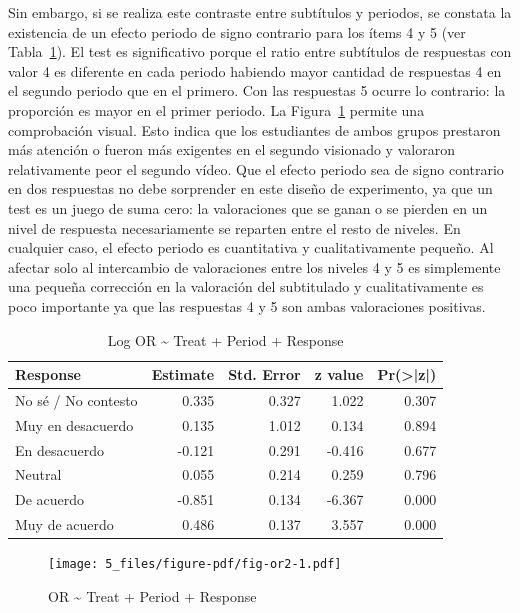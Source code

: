 \documentclass[
  12pt,
  a4paper,
  extrafontsizes,
  onecolumn,
  openright,
  table]{memoir}
\begin{document}
Sin embargo, si se realiza este contraste entre subtítulos y periodos,
se constata la existencia de un efecto periodo de signo contrario para
los ítems 4 y 5 (ver Tabla~\ref{tbl-logor2}). El test es significativo
porque el ratio entre subtítulos de respuestas con valor 4 es diferente
en cada periodo habiendo mayor cantidad de respuestas 4 en el segundo
periodo que en el primero. Con las respuestas 5 ocurre lo contrario: la
proporción es mayor en el primer periodo. La Figura~\ref{fig-or2}
permite una comprobación visual. Esto indica que los estudiantes de
ambos grupos prestaron más atención o fueron más exigentes en el segundo
visionado y valoraron relativamente peor el segundo vídeo. Que el efecto
periodo sea de signo contrario en dos respuestas no debe sorprender en
este diseño de experimento, ya que un test es un juego de suma cero: la
valoraciones que se ganan o se pierden en un nivel de respuesta
necesariamente se reparten entre el resto de niveles. En cualquier caso,
el efecto periodo es cuantitativa y cualitativamente pequeño. Al afectar
solo al intercambio de valoraciones entre los niveles 4 y 5 es
simplemente una pequeña corrección en la valoración del subtitulado y
cualitativamente es poco importante ya que las respuestas 4 y 5 son
ambas valoraciones positivas.

\hypertarget{tbl-logor2}{}
\begin{longtable}{lrrrr}
\caption{\label{tbl-logor2}Log OR \textasciitilde{} Treat + Period + Response }\tabularnewline

\toprule
Response & Estimate & Std. Error & z value & Pr(>|z|) \\ 
\midrule
No sé / No contesto & 0.335 & 0.327 & 1.022 & 0.307 \\ 
Muy en desacuerdo & 0.135 & 1.012 & 0.134 & 0.894 \\ 
En desacuerdo & -0.121 & 0.291 & -0.416 & 0.677 \\ 
Neutral & 0.055 & 0.214 & 0.259 & 0.796 \\ 
De acuerdo & -0.851 & 0.134 & -6.367 & 0.000 \\ 
Muy de acuerdo & 0.486 & 0.137 & 3.557 & 0.000 \\ 
\bottomrule
\end{longtable}

\begin{figure}[h]

{\centering \texttt{[image: 5\_files/figure-pdf/fig-or2-1.pdf]}

}

\caption[Test Odds Ratio \textasciitilde{} Treat + Period +
Response]{\label{fig-or2}OR \textasciitilde{} Treat + Period + Response}

\end{figure}
\end{document}
